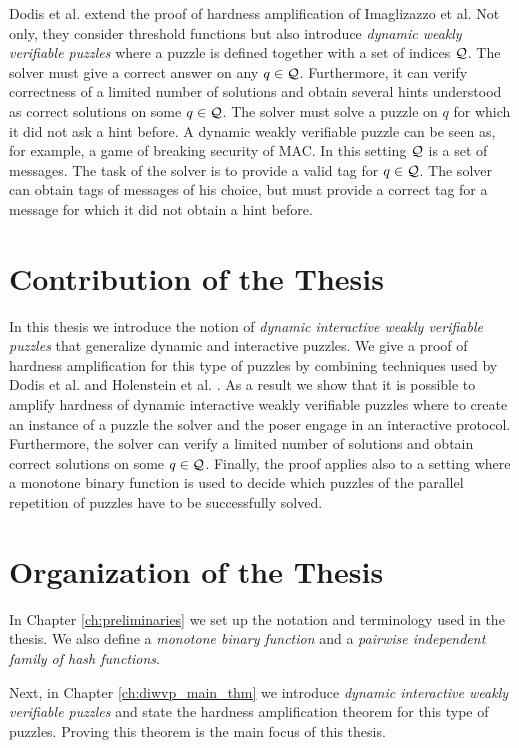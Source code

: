 Dodis et al. \cite{dodis2009security} extend the proof of hardness amplification of Imaglizazzo et al.
Not only, they consider threshold functions but also introduce \textit{dynamic weakly verifiable puzzles} where a puzzle is defined together with a set of indices $\mathcal{Q}$.
The solver must give a correct answer on any $q \in \mathcal{Q}$. Furthermore, it can verify correctness of a limited number of solutions and
obtain several hints understood as correct solutions on some $q \in \mathcal{Q}$. The solver must solve a puzzle on $q$ for which it did not ask a hint before.
A dynamic weakly verifiable puzzle can be seen as, for example, a game of breaking security of MAC.
In this setting $\mathcal{Q}$ is a set of messages. The task of the solver is to provide a valid tag for $q \in \mathcal{Q}$.
The solver can obtain tags of messages of his choice, but must provide a correct tag for a message for which it did not obtain a hint before.

\section{Contribution of the Thesis}
In this thesis we introduce the notion of \textit{dynamic interactive weakly verifiable puzzles} that generalize dynamic and interactive puzzles.
We give a proof of hardness amplification for this type of puzzles by combining techniques
used by Dodis et al. \cite{dodis2009security} and Holenstein et al. \cite{holenstein2011general}.
As a result we show that it is possible to amplify hardness of dynamic interactive weakly verifiable puzzles where
to create an instance of a puzzle the solver and the poser engage in an interactive protocol.
Furthermore, the solver can verify a limited number of solutions and obtain correct solutions on some $q \in \mathcal{Q}$.
Finally, the proof applies also to a setting where a monotone binary function is used to decide which puzzles of the parallel repetition of puzzles
have to be successfully solved.
%
\section{Organization of the Thesis}
In Chapter \ref{ch:preliminaries} we set up the notation and terminology used in the thesis.
We also define a \textit{monotone binary function} and a \textit{pairwise independent family of hash functions}.

Next, in Chapter \ref{ch:diwvp_main_thm} we introduce \textit{dynamic interactive weakly verifiable
puzzles} and state the hardness amplification theorem for this type of puzzles.
Proving this theorem is the main focus of this thesis.

